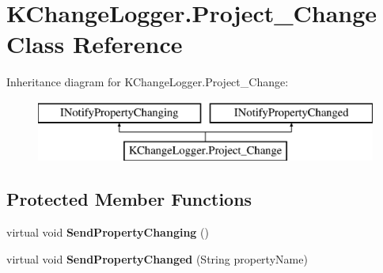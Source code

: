 \hypertarget{class_k_change_logger_1_1_project___change}{\section{K\-Change\-Logger.\-Project\-\_\-\-Change Class Reference}
\label{class_k_change_logger_1_1_project___change}
}
Inheritance diagram for K\-Change\-Logger.\-Project\-\_\-\-Change\-:\begin{figure}[H]
\begin{center}
\leavevmode
\includegraphics[height=2.000000cm]{class_k_change_logger_1_1_project___change}
\end{center}
\end{figure}
\subsection*{Protected Member Functions}
\begin{DoxyCompactItemize}
\item 
\hypertarget{class_k_change_logger_1_1_project___change_afa4900f6c7b0ee114781a09892e35854}{virtual void {\bfseries Send\-Property\-Changing} ()}\label{class_k_change_logger_1_1_project___change_afa4900f6c7b0ee114781a09892e35854}

\item 
\hypertarget{class_k_change_logger_1_1_project___change_abf1f004197ce366446c1cbf2f25aebf3}{virtual void {\bfseries Send\-Property\-Changed} (String property\-Name)}\label{class_k_change_logger_1_1_project___change_abf1f004197ce366446c1cbf2f25aebf3}

\end{DoxyCompactItemize}
